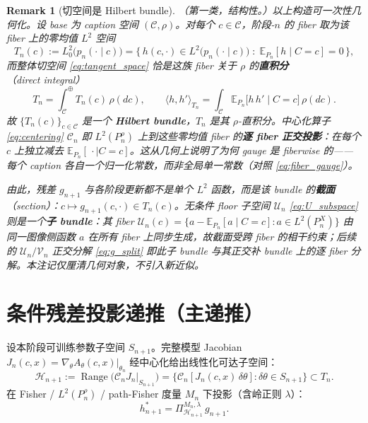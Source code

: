 \documentclass[11pt,a4paper]{article}
\newtheorem{remark}[theorem]{Remark}
\newcommand{\E}{\mathbb{E}}
\newcommand{\cH}{\mathcal{H}}
\newcommand{\cC}{\mathcal{C}}
\newcommand{\cU}{\mathcal{U}}
\newcommand{\cV}{\mathcal{V}}
\newcommand{\ProjectOp}{\Pi}
\newcommand{\Range}{\operatorname{Range}}
\newcommand{\Center}{\mathcal{C}}
\begin{document}
\begin{remark}[切空间是 Hilbert bundle]\label{rem:hilbert_bundle}
（第一类，结构性。）以上构造可一次性几何化。设 base 为 caption 空间 $(\cC,\rho)$。对每个 $c\in\cC$，阶段-$n$ 的 fiber 取为该 fiber 上的零均值 $L^2$ 空间
\[
T_n(c) := L^2_0\bigl(p_n(\cdot\mid c)\bigr) = \bigl\{\, h(c,\cdot)\in L^2\bigl(p_n(\cdot\mid c)\bigr) \;:\; \E_{P_n}[h\mid C=c]=0 \,\bigr\},
\]
而整体切空间 \eqref{eq:tangent_space} 恰是这族 fiber 关于 $\rho$ 的\textbf{直积分}（direct integral）
\[
T_n = \int^\oplus_{\cC} T_n(c)\,\rho(dc),\qquad
\langle h,h'\rangle_{T_n} = \int_\cC \E_{P_n}\!\bigl[h\,h'\mid C=c\bigr]\,\rho(dc).
\]
故 $\{T_n(c)\}_{c\in\cC}$ 是一个 \textbf{Hilbert bundle}，$T_n$ 是其 $\rho$-直积分。中心化算子 \eqref{eq:centering} $\Center_n$ 即 $L^2(P_n^\rho)$ 上到这些零均值 fiber 的\textbf{逐 fiber 正交投影}：在每个 $c$ 上独立减去 $\E_{P_n}[\,\cdot\mid C=c]$。这从几何上说明了为何 gauge 是 fiberwise 的——每个 caption 各自一个归一化常数，而非全局单一常数（对照 \eqref{eq:fiber_gauge}）。

由此，残差 $g_{n+1}$ 与各阶段更新都不是单个 $L^2$ 函数，而是该 bundle 的\textbf{截面}（section）：$c\mapsto g_{n+1}(c,\cdot)\in T_n(c)$。无条件 floor 子空间 $\cU_n$ \eqref{eq:U_subspace} 则是一个\textbf{子 bundle}：其 fiber $\cU_n(c)=\{a-\E_{P_n}[a\mid C=c]:a\in L^2(P_n^X)\}$ 由同一图像侧函数 $a$ 在所有 fiber 上同步生成，故截面受跨 fiber 的相干约束；后续的 $\cU_n/\cV_n$ 正交分解 \eqref{eq:g_split} 即此子 bundle 与其正交补 bundle 上的逐 fiber 分解。本注记仅厘清几何对象，不引入新近似。
\end{remark}

\section{条件残差投影递推（主递推）}
\label{sec:cond_recursion}

设本阶段可训练参数子空间 $S_{n+1}$。完整模型 Jacobian $J_n(c,x)=\nabla_\theta A_\theta(c,x)|_{\theta_n}$ 经中心化给出线性化可达子空间：
\begin{equation}\label{eq:reachable_cond}
\cH_{n+1} := \Range\!\bigl(\Center_n J_n|_{S_{n+1}}\bigr) = \bigl\{\Center_n[J_n(c,x)\,\delta\theta] : \delta\theta\in S_{n+1}\bigr\} \subset T_n.
\end{equation}
在 Fisher / $L^2(P_n^\rho)$ / path-Fisher 度量 $M_n$ 下投影（含岭正则 $\lambda$）：
\begin{equation}\label{eq:cond_projection}
h^*_{n+1} = \ProjectOp^{M_n,\lambda}_{\cH_{n+1}}\,g_{n+1}.
\end{equation}
\end{document}
